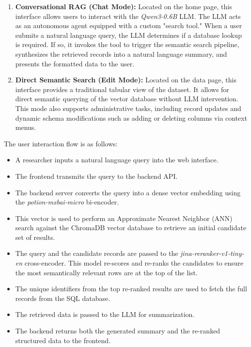 \documentclass[journal]{./IEEE/IEEEtran}
\begin{document}
\begin{enumerate}
\item \textbf{Conversational RAG (Chat Mode):} Located on the home page, this interface allows users to interact with the \textit{Qwen3-0.6B} LLM. The LLM acts as an autonomous agent equipped with a custom "search tool." When a user submits a natural language query, the LLM determines if a database lookup is required. If so, it invokes the tool to trigger the semantic search pipeline, synthesizes the retrieved records into a natural language summary, and presents the formatted data to the user.
\item \textbf{Direct Semantic Search (Edit Mode):} Located on the data page, this interface provides a traditional tabular view of the dataset. It allows for direct semantic querying of the vector database without LLM intervention. This mode also supports administrative tasks, including record updates and dynamic schema modifications such as adding or deleting columns via context menus.
\end{enumerate}

The user interaction flow is as follows:
\begin{itemize}
    \item A researcher inputs a natural language query into the web interface.
    \item The frontend transmits the query to the backend API.
    \item The backend server converts the query into a dense vector embedding using the \textit{potion-mxbai-micro} bi-encoder.
    \item This vector is used to perform an Approximate Nearest Neighbor (ANN) search against the ChromaDB vector database to retrieve an initial candidate set of results.
    \item The query and the candidate records are passed to the \textit{jina-reranker-v1-tiny-en} cross-encoder. This model re-scores and re-ranks the candidates to ensure the most semantically relevant rows are at the top of the list.
    \item The unique identifiers from the top re-ranked results are used to fetch the full records from the SQL database.
    \item The retrieved data is passed to the LLM for summarization.
    \item The backend returns both the generated summary and the re-ranked structured data to the frontend.
\end{itemize}
\end{document}
